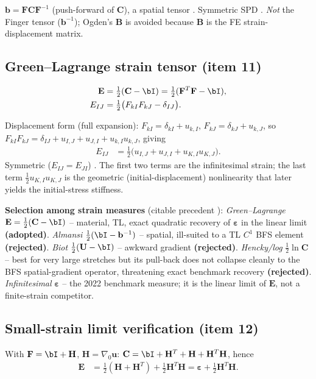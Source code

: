 \documentclass[11pt]{article}
\newcommand{\gradz}{\nabla_{0}}
\newcommand{\bu}{\mathbf{u}}
\newcommand{\bF}{\mathbf{F}}
\newcommand{\bC}{\mathbf{C}}
\newcommand{\bb}{\mathbf{b}}
\newcommand{\bE}{\mathbf{E}}
\newcommand{\bep}{\boldsymbol{\varepsilon}}
\newcommand{\bH}{\mathbf{H}}
\newcommand{\gradz}{\nabla_{0}}
\newcommand{\bu}{\mathbf{u}}
\newcommand{\bF}{\mathbf{F}}
\newcommand{\bC}{\mathbf{C}}
\newcommand{\bb}{\mathbf{b}}
\newcommand{\bE}{\mathbf{E}}
\newcommand{\bep}{\boldsymbol{\varepsilon}}
\newcommand{\bH}{\mathbf{H}}
\newcommand{\bU}{\mathbf{U}}
\begin{document}
$\bb=\bF\bC\bF^{-1}$ (push-forward of $\bC$), a spatial tensor
\cite{Holzapfel2000}. Symmetric SPD \checkmark. \emph{Not} the Finger
tensor ($\bb^{-1}$); Ogden's $\mathbf{B}$ is avoided because
$\mathbf{B}$ is the FE strain-displacement matrix.

\subsection{Green--Lagrange strain tensor (item 11)}
\begin{align}
\bE &= \tfrac12(\bC-\bI)=\tfrac12(\bF^{T}\bF-\bI),
\label{eq:n_E}\\
E_{IJ} &= \tfrac12\bigl(F_{kI}F_{kJ}-\delta_{IJ}\bigr).
\label{eq:n_Ecomp}
\end{align}

Displacement form (full expansion):
$F_{kI}=\delta_{kI}+u_{k,I}$, $F_{kJ}=\delta_{kJ}+u_{k,J}$, so
$F_{kI}F_{kJ}=\delta_{IJ}+u_{I,J}+u_{J,I}+u_{k,I}u_{k,J}$, giving
\begin{align}
E_{IJ} &= \tfrac12\bigl(u_{I,J}+u_{J,I}+u_{K,I}u_{K,J}\bigr).
\label{eq:n_Eu}
\end{align}
Symmetric ($E_{IJ}=E_{JI}$) \checkmark. The first two terms are the
infinitesimal strain; the last term $\tfrac12u_{K,I}u_{K,J}$ is the
geometric (initial-displacement) nonlinearity that later yields the
initial-stress stiffness.

\textbf{Selection among strain measures} (citable precedent
\cite{Holzapfel2000,Hill1968}): \emph{Green--Lagrange}
$\bE=\tfrac12(\bC-\bI)$ -- material, TL, exact quadratic recovery of
$\bep$ in the linear limit \textbf{(adopted)}. \emph{Almansi}
$\tfrac12(\bI-\bb^{-1})$ -- spatial, ill-suited to a TL $C^{1}$ BFS
element \textbf{(rejected)}. \emph{Biot} $\tfrac12(\bU-\bI)$ -- awkward
gradient \textbf{(rejected)}. \emph{Hencky/log} $\tfrac12\ln\bC$ --
best for very large stretches but its pull-back does not collapse
cleanly to the BFS spatial-gradient operator, threatening exact benchmark
recovery \textbf{(rejected)}. \emph{Infinitesimal} $\bep$ --
the 2022 benchmark measure; it is the linear limit of $\bE$, not a
finite-strain competitor.

\subsection{Small-strain limit verification (item 12)}

With $\bF=\bI+\bH$, $\bH=\gradz\bu$:
$\bC=\bI+\bH^{T}+\bH+\bH^{T}\bH$, hence
\begin{align}
\bE &= \tfrac12(\bH+\bH^{T})+\tfrac12\bH^{T}\bH
    = \bep + \tfrac12\bH^{T}\bH.
\label{eq:n_limit1}
\end{align}
\end{document}
